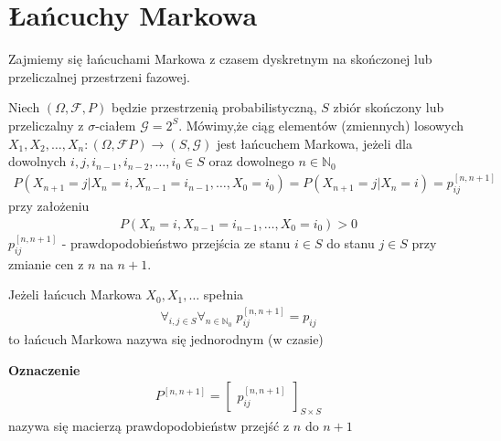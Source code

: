 \section{Łańcuchy Markowa}
Zajmiemy się łańcuchami Markowa z czasem dyskretnym na skończonej lub przeliczalnej przestrzeni fazowej.
\begin{defi}
Niech $ (\Omega,\mathcal F ,P) $ będzie przestrzenią probabilistyczną, $ S $ zbiór skończony lub przeliczalny z $ \sigma $-ciałem $ \mathcal G=2^S $. Mówimy,że ciąg elementów (zmiennych) losowych $ X_1,X_2,\dots,X_n:(\Omega,\mathcal F P) \to(S,\mathcal G) $ jest łańcuchem Markowa, jeżeli dla dowolnych $ i,j,i_{n-1},i_{n-2},\dots,i_0\in S $ oraz dowolnego $ n\in \mathbb N _0 $
\begin{gather*}
P\left(X_{n+1}=j|X_n=i,X_{n-1}=i_{n-1},\dots,X_0=i_0\right)=
P\left(X_{n+1}=j|X_n=i\right)=
p_{ij}^{[n,n+1]}
\end{gather*}
przy założeniu
\begin{gather*}
P\left(X_n=i,X_{n-1}=i_{n-1},\dots,X_0=i_0\right)>0
\end{gather*}
$ p_{ij}^{[n,n+1]} $ - prawdopodobieństwo przejścia ze stanu $ i\in S $ do stanu $ j\in S $ przy zmianie cen z $ n $ na $ n+1 $.
\end{defi}
\begin{defi}
Jeżeli łańcuch Markowa $ X_0,X_1,\dots$ spełnia
\begin{gather*}
\forall_{i,j\in S}\forall_{n\in \mathbb N _0}\;p_{ij}^{[n,n+1]}=p_{ij}
\end{gather*}
to łańcuch Markowa nazywa się jednorodnym (w czasie)
\end{defi}
\textbf{Oznaczenie}
\begin{gather*}
P^{[n,n+1]}=
\begin{bmatrix}
p_{ij}^{[n,n+1]}
\end{bmatrix}_{S\times S}
\end{gather*}
nazywa się macierzą prawdopodobieństw przejść z $ n $ do $ n+1 $

